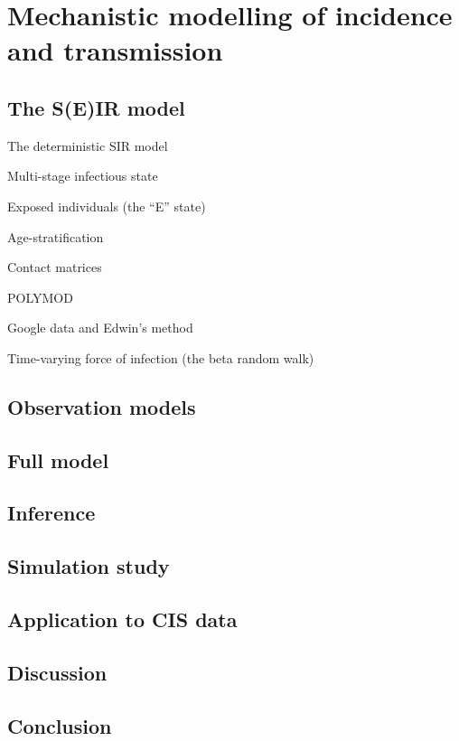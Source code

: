 \documentclass[thesis.tex]{subfiles}
\begin{document}
\chapter{Mechanistic modelling of incidence and transmission} \label{SEIR}

\section{The S(E)IR model}

The deterministic SIR model

Multi-stage infectious state

Exposed individuals (the “E” state)

Age-stratification

    Contact matrices

    POLYMOD

Google data and Edwin’s method

Time-varying force of infection (the beta random walk)


\section{Observation models}

\section{Full model}

\section{Inference}

\section{Simulation study}

\section{Application to CIS data}

\section{Discussion}

\section{Conclusion}
\end{document}
